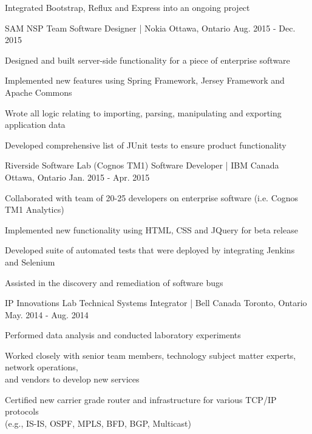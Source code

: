 \begin{cventries}
{\begin{cvitems}
        \item {Integrated Bootstrap, Reflux and Express into an ongoing project}
      \end{cvitems}
    }
  \cventry
    {SAM NSP Team}
    {Software Designer | Nokia}
    {Ottawa, Ontario}
    {Aug. 2015 - Dec. 2015}
    {
      \begin{cvitems}
        \item {Designed and built server-side functionality for a piece of enterprise software}
        \item {Implemented new features using Spring Framework, Jersey Framework and Apache Commons}
        \item {Wrote all logic relating to importing, parsing, manipulating and exporting application data}
        \item {Developed comprehensive list of JUnit tests to ensure product functionality}
      \end{cvitems}
    }
    \newpage
  \cventry
    {Riverside Software Lab (Cognos TM1)}
    {Software Developer | IBM Canada}
    {Ottawa, Ontario}
    {Jan. 2015 - Apr. 2015}
    {
      \begin{cvitems}
        \item {Collaborated with team of 20-25 developers on enterprise software (i.e. Cognos TM1 Analytics)}
        \item {Implemented new functionality using HTML, CSS and JQuery for beta release}
        \item {Developed suite of automated tests that were deployed by integrating Jenkins and Selenium}
        \item {Assisted in the discovery and remediation of software bugs}
      \end{cvitems}
    }
  \cventry
    {IP Innovations Lab}
    {Technical Systems Integrator | Bell Canada}
    {Toronto, Ontario}
    {May. 2014 - Aug. 2014}
    {
      \begin{cvitems}
        \item {Performed data analysis and conducted laboratory experiments}
        \item {Worked closely with senior team members, technology subject matter experts, network operations, \\ and vendors to develop new services}
        \item {Certified new carrier grade router and infrastructure for various TCP/IP protocols \\ (e.g., IS-IS, OSPF, MPLS, BFD, BGP, Multicast)}
      \end{cvitems}
    }
\end{cventries}
